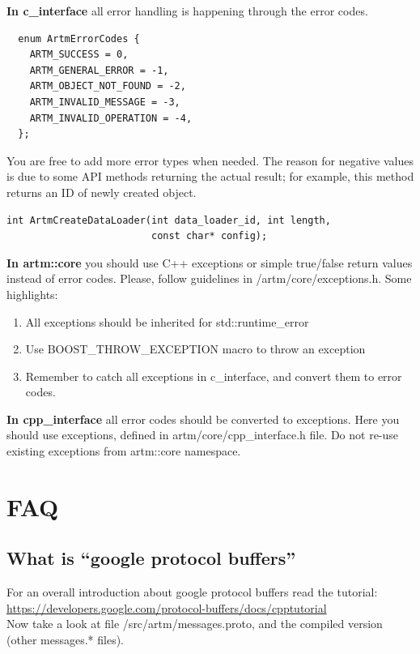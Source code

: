\documentclass[11pt,a4paper,twoside]{report}
\begin{document}
\textbf{In c\_interface} all error handling is happening through the error codes.
\begin{verbatim}
  enum ArtmErrorCodes {
    ARTM_SUCCESS = 0,
    ARTM_GENERAL_ERROR = -1,
    ARTM_OBJECT_NOT_FOUND = -2,
    ARTM_INVALID_MESSAGE = -3,
    ARTM_INVALID_OPERATION = -4,
  };
\end{verbatim}
You are free to add more error types when needed.
The reason for negative values is due to some API methods
returning the actual result; for example, this method returns an ID of newly created object.
\begin{verbatim}
int ArtmCreateDataLoader(int data_loader_id, int length,
                         const char* config);
\end{verbatim}

\textbf{In artm::core} you should use C++ exceptions
or simple true/false return values instead of error codes.
Please, follow guidelines in /artm/core/exceptions.h.
Some highlights:
\begin{enumerate}
    \item All exceptions should be inherited for std::runtime\_error
    \item Use BOOST\_THROW\_EXCEPTION macro to throw an exception
    \item Remember to catch all exceptions in c\_interface, and convert them to error codes.
\end{enumerate}

\textbf{In cpp\_interface} all error codes should be converted to exceptions.
Here you should use exceptions, defined in artm/core/cpp\_interface.h file.
Do not re-use existing exceptions from artm::core namespace.

\section{FAQ}

\subsection{What is ``google protocol buffers''}

For an overall introduction about google protocol buffers read the tutorial: \\
\url{https://developers.google.com/protocol-buffers/docs/cpptutorial} \\
Now take a look at file /src/artm/messages.proto,
and the compiled version (other messages.* files).
\end{document}
